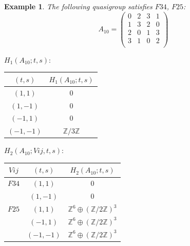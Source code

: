 \documentclass[11pt]{amsart}
\newtheorem{example}[theorem]{Example}
\theoremstyle{definition}
\newcommand{\Z}{\mathbb{Z}}
\begin{document}
\begin{example}
The following quasigroup satisfies 
$F34$, $F25$:
   \[ A_{10} = \left(
\begin{array}{cccc}
 0 & 2 & 3 & 1 \\
 1 & 3 & 2 & 0 \\
 2 & 0 & 1 & 3 \\
 3 & 1 & 0 & 2 \\
\end{array}
\right)\]


\bigskip


$H_1(A_{10};t,s):$

\begin{center}
    
\begin{tabular}{c|c}
    $(t,s)$ & $H_1(A_{10};t,s)$  \\
    \hline
    $(1,1)$ & $0$ \\
    $(1,-1)$ & $0$ \\
    $(-1,1)$ & $0$ \\
    $(-1,-1)$ & $\Z/3\Z$ \\
\end{tabular}
\end{center}
\bigskip

$H_2(A_{10};Vij,t,s):$

\begin{center}
    
\begin{tabular}{c|c|c}
    $Vij$ & $(t,s)$ & $H_2(A_{10};t,s)$  \\
    \hline


    $F34$ & $(1,1)$ & $0$ \\
        & $(1,-1)$ & $0$ \\
    $F25$ & $(1,1)$ & $\Z^6 \oplus (\Z/2\Z)^3$ \\
        & $(-1,1)$ & $\Z^6 \oplus (\Z/2\Z)^3$ \\
        & $(-1,-1)$ & $\Z^6 \oplus (\Z/2\Z)^3$ \\
\end{tabular}
\end{center}

\end{example}
\end{document}
